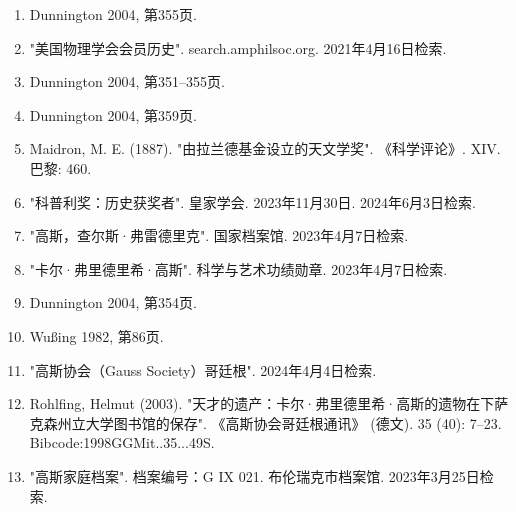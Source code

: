 \begin{enumerate}
\item Dunnington 2004, 第355页.  
\item "美国物理学会会员历史". search.amphilsoc.org. 2021年4月16日检索.  
\item Dunnington 2004, 第351–355页.  
\item Dunnington 2004, 第359页.  
\item Maidron, M. E. (1887). "由拉兰德基金设立的天文学奖". 《科学评论》. XIV. 巴黎: 460.  
\item "科普利奖：历史获奖者". 皇家学会. 2023年11月30日. 2024年6月3日检索.  
\item "高斯，查尔斯·弗雷德里克". 国家档案馆. 2023年4月7日检索.  
\item "卡尔·弗里德里希·高斯". 科学与艺术功绩勋章. 2023年4月7日检索.  
\item Dunnington 2004, 第354页.  
\item Wußing 1982, 第86页.  
\item "高斯协会（Gauss Society）哥廷根". 2024年4月4日检索.  
\item Rohlfing, Helmut (2003). "天才的遗产：卡尔·弗里德里希·高斯的遗物在下萨克森州立大学图书馆的保存". 《高斯协会哥廷根通讯》 (德文). 35 (40): 7–23. Bibcode:1998GGMit..35...49S.  
\item "高斯家庭档案". 档案编号：G IX 021. 布伦瑞克市档案馆. 2023年3月25日检索.
\end{enumerate}
